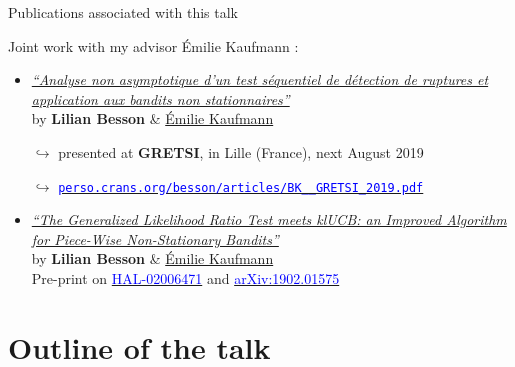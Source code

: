 \documentclass[11pt,english,ignorenonframetext,]{beamer}
\begin{document}
\begin{frame}{Publications associated with this talk}

  Joint work with my advisor Émilie Kaufmann
  \dInnocey{} :

  \begin{itemize}
    \item
      \href{https://hal.inria.fr/hal-02006471/document}{\emph{``Analyse non asymptotique d'un test séquentiel de détection de ruptures et application aux bandits non stationnaires''}}\\
      by \textbf{Lilian Besson} \&
      \href{http://chercheurs.lille.inria.fr/ekaufman/research.html}{Émilie
      Kaufmann}

      $\hookrightarrow$ presented at
      \textbf{GRETSI}, in Lille (France), next August 2019

      \begin{footnotesize}
        $\hookrightarrow$ \href{https://perso.crans.org/besson/articles/BK__GRETSI_2019.pdf}{\textcolor{blue}{\texttt{perso.crans.org/besson/articles/BK\_\_GRETSI\_2019.pdf}}}
      \end{footnotesize}

    \vspace*{30pt}

    \item
      \href{https://hal.inria.fr/hal-02006471/document}{\emph{``The Generalized Likelihood Ratio Test meets klUCB: an Improved Algorithm for Piece-Wise Non-Stationary Bandits''}}\\
      by \textbf{Lilian Besson} \&
      \href{http://chercheurs.lille.inria.fr/ekaufman/research.html}{Émilie
      Kaufmann}\\
      Pre-print on
      \href{https://hal.inria.fr/hal-02006471}{\textcolor{blue}{HAL-02006471}}
      and
      \href{https://arxiv.org/abs/1902.01575}{\textcolor{blue}{arXiv:1902.01575}}

  \end{itemize}

\end{frame}


\section{\hfill{}Outline of the talk\hfill{}}
\end{document}
